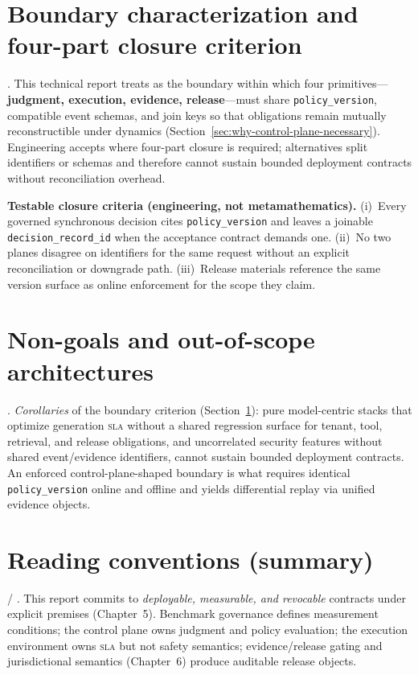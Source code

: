\documentclass[11pt,a4paper]{report}
\begin{document}
\section{Boundary characterization and four-part closure criterion}\label{sec:boundary-characterization}
\ControlPlane{}. This technical report treats \ControlPlane{} as the boundary within which four primitives—\textbf{judgment, execution, evidence, release}—must share \texttt{policy\_version}, compatible event schemas, and join keys so that obligations remain mutually reconstructible under dynamics (Section~\ref{sec:why-control-plane-necessary}). Engineering accepts \ControlPlane{} where four-part closure is required; alternatives split identifiers or schemas and therefore cannot sustain bounded deployment contracts without reconciliation overhead.

\noindent\textbf{Testable closure criteria (engineering, not metamathematics).} (i)~Every governed synchronous decision cites \texttt{policy\_version} and leaves a joinable \texttt{decision\_record\_id} when the acceptance contract demands one. (ii)~No two planes disagree on identifiers for the same request without an explicit reconciliation or downgrade path. (iii)~Release materials reference the same version surface as online enforcement for the scope they claim.

\section{Non-goals and out-of-scope architectures}
\ControlPlane{}. \emph{Corollaries} of the boundary criterion (Section~\ref{sec:boundary-characterization}): pure model-centric stacks that optimize generation \textsc{sla} without a shared regression surface for tenant, tool, retrieval, and release obligations, and uncorrelated security features without shared event/evidence identifiers, cannot sustain bounded deployment contracts. An enforced control-plane-shaped boundary is what requires identical \texttt{policy\_version} online and offline and yields differential replay via unified evidence objects.

\section{Reading conventions (summary)}
\ControlPlane{} / \EvalFramework{}. This report commits to \emph{deployable, measurable, and revocable} contracts under explicit premises (Chapter~5). Benchmark governance defines measurement conditions; the control plane owns judgment and policy evaluation; the execution environment owns \textsc{sla} but not safety semantics; evidence/release gating and jurisdictional semantics (Chapter~6) produce auditable release objects.
\end{document}
